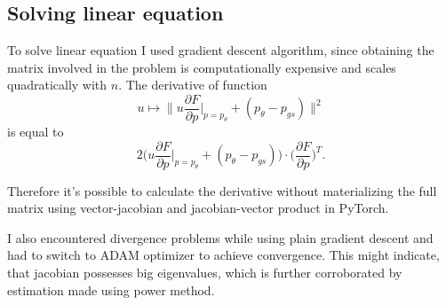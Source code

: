 \documentclass[a4paper,10.5pt]{report}
\begin{document}
\subsection{Solving linear equation}
To solve linear equation I used gradient descent algorithm, since obtaining the matrix involved in the problem is computationally expensive and scales quadratically with $n$.
The derivative of function
\begin{equation*}
 u\mapsto \bigg\|u \frac{\partial F}{\partial p}\bigg|_{p=p_\theta} + (p_\theta-p_{gs})\bigg\|^2
 \end{equation*}
 is equal to
 \begin{equation*}
  2 \bigg( u \frac{\partial F}{\partial p}\bigg|_{p=p_\theta} + (p_\theta-p_{gs})  \bigg) \cdot \bigg(\frac{\partial F}{\partial p}\bigg)^T.
\end{equation*}

Therefore it's possible to calculate the derivative without materializing the full matrix using vector-jacobian and jacobian-vector product in PyTorch.

I also encountered divergence problems while using plain gradient descent and had to switch to ADAM optimizer to achieve convergence. This might  indicate, that jacobian possesses big eigenvalues, which is further corroborated by estimation made using power method.
\end{document}
